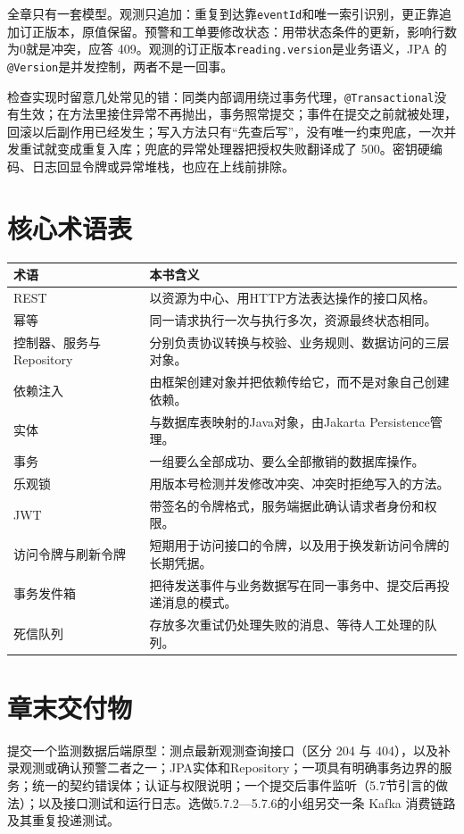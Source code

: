 全章只有一套模型。观测只追加：重复到达靠\texttt{eventId}和唯一索引识别，更正靠追加订正版本，原值保留。预警和工单要修改状态：用带状态条件的更新，影响行数为0就是冲突，应答 409。观测的订正版本\texttt{reading.version}是业务语义，JPA 的\texttt{@Version}是并发控制，两者不是一回事。

检查实现时留意几处常见的错：同类内部调用绕过事务代理，\texttt{@Transactional}没有生效；在方法里接住异常不再抛出，事务照常提交；事件在提交之前就被处理，回滚以后副作用已经发生；写入方法只有“先查后写”，没有唯一约束兜底，一次并发重试就变成重复入库；兜底的异常处理器把授权失败翻译成了 500。密钥硬编码、日志回显令牌或异常堆栈，也应在上线前排除。

\section*{核心术语表}

\begin{longtable}{p{2.6cm}p{10.0cm}}
\toprule
术语 & 本书含义 \\
\midrule
REST & 以资源为中心、用HTTP方法表达操作的接口风格。 \\
幂等 & 同一请求执行一次与执行多次，资源最终状态相同。 \\
控制器、服务与Repository & 分别负责协议转换与校验、业务规则、数据访问的三层对象。 \\
依赖注入 & 由框架创建对象并把依赖传给它，而不是对象自己创建依赖。 \\
实体 & 与数据库表映射的Java对象，由Jakarta Persistence管理。 \\
事务 & 一组要么全部成功、要么全部撤销的数据库操作。 \\
乐观锁 & 用版本号检测并发修改冲突、冲突时拒绝写入的方法。 \\
JWT & 带签名的令牌格式，服务端据此确认请求者身份和权限。 \\
访问令牌与刷新令牌 & 短期用于访问接口的令牌，以及用于换发新访问令牌的长期凭据。 \\
事务发件箱 & 把待发送事件与业务数据写在同一事务中、提交后再投递消息的模式。 \\
死信队列 & 存放多次重试仍处理失败的消息、等待人工处理的队列。 \\
\bottomrule
\end{longtable}

\section*{章末交付物}

提交一个监测数据后端原型：测点最新观测查询接口（区分 204 与 404），以及补录观测或确认预警二者之一；JPA实体和Repository；一项具有明确事务边界的服务；统一的契约错误体；认证与权限说明；一个提交后事件监听（5.7节引言的做法）；以及接口测试和运行日志。选做5.7.2—5.7.6的小组另交一条 Kafka 消费链路及其重复投递测试。

